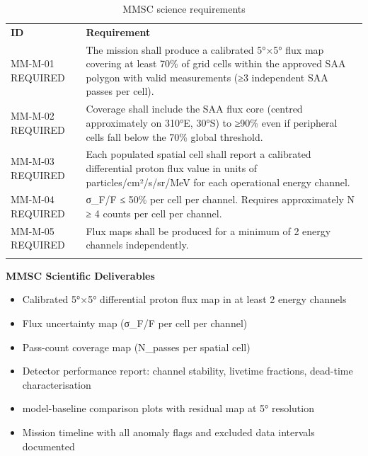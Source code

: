 \begin{longtable}{@{}
  >{\raggedright\arraybackslash}p{}
  >{\raggedright\arraybackslash}p{}@{}}
\caption{MMSC science requirements}\label{tab:01-mission-context-3}\\
\toprule\noalign{}
\textbf{ID} & \textbf{Requirement} \\
MM-M-01 REQUIRED & The mission shall produce a calibrated 5°×5° flux map covering at least
70\% of grid cells within the approved SAA polygon with valid measurements
(≥3 independent SAA passes per cell). \\
MM-M-02 REQUIRED & Coverage shall include the SAA flux core (centred approximately on
310°E, 30°S) to ≥90\% even if peripheral cells fall below the 70\%
global threshold. \\
MM-M-03 REQUIRED & Each populated spatial cell shall report a calibrated differential
proton flux value in units of particles/cm²/s/sr/MeV for each
operational energy channel. \\
MM-M-04 REQUIRED & σ\_F/F ≤ 50\% per cell per channel. Requires approximately N ≥ 4 counts
per cell per channel. \\
MM-M-05 REQUIRED & Flux maps shall be produced for a minimum of 2 energy channels
independently. \\
\midrule\noalign{}
\endhead
\bottomrule\noalign{}
\endlastfoot
\end{longtable}


\textbf{MMSC Scientific Deliverables}

\begin{itemize}
\item
  Calibrated 5°×5° differential proton flux map in at least 2 energy
  channels
\item
  Flux uncertainty map (σ\_F/F per cell per channel)
\item
  Pass-count coverage map (N\_passes per spatial cell)
\item
  Detector performance report: channel stability, livetime fractions,
  dead-time characterisation
\item
  model-baseline comparison plots with residual map at 5° resolution
\item
  Mission timeline with all anomaly flags and excluded data intervals
  documented
\end{itemize}

